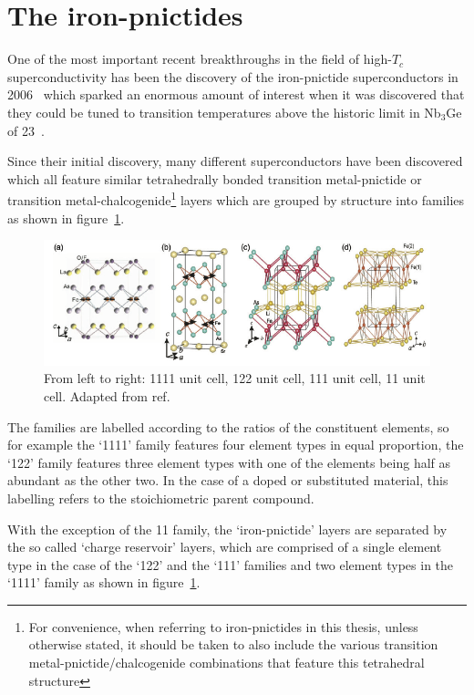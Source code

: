 
\section{The iron-pnictides}

One of the most important recent breakthroughs in the field of high-$T_c$ superconductivity has been the discovery of the iron-pnictide superconductors in 2006~\cite{Kamihara2006, Kamihara2008} which sparked an enormous amount of interest when it was discovered that they could be tuned to transition temperatures above the historic limit in Nb$_3$Ge of \unit{23}{\kelvin}~\cite{Attfield2010}.

Since their initial discovery, many different superconductors have been discovered which all feature similar tetrahedrally bonded transition metal-pnictide or transition metal-chalcogenide\footnote{For convenience, when referring to iron-pnictides in this thesis, unless otherwise stated, it should be taken to also include the various transition metal-pnictide/chalcogenide combinations that feature this tetrahedral structure} layers which are grouped by structure into families as shown in figure~\ref{Fig:Intro:PnictideUnitCells}.
\begin{figure}[htbp]
    \begin{center}
        \includegraphics[scale=1.1]{Chapter-Introduction/Figures/PnictideUnitCells/PnictideUnitCells}
        \caption{From left to right: 1111 unit cell, 122 unit cell, 111 unit cell, 11 unit cell. Adapted from ref.~\cite{Johnston2010}}
        \label{Fig:Intro:PnictideUnitCells}
    \end{center}
\end{figure}
The families are labelled according to the ratios of the constituent elements, so for example the `1111' family features four element types in equal proportion, the `122' family features three element types with one of the elements being half as abundant as the other two. In the case of a doped or substituted material, this labelling refers to the stoichiometric parent compound. 

With the exception of the 11 family, the `iron-pnictide' layers are separated by the so called `charge reservoir' layers, which are comprised of a single element type in the case of the `122' and the `111' families and two element types in the `1111' family as shown in figure~\ref{Fig:Intro:PnictideUnitCells}.

